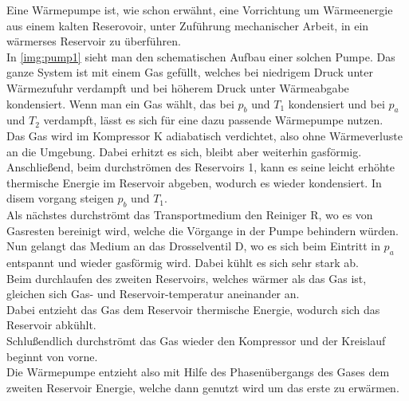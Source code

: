 Eine Wärmepumpe ist, wie schon erwähnt, eine Vorrichtung um Wärmeenergie aus einem kalten 
Reserovoir, unter Zuführung mechanischer Arbeit, in ein wärmerses Reservoir zu überführen.\\
In \ref{img:pump1} sieht man den schematischen Aufbau einer solchen Pumpe.
Das ganze System ist mit einem Gas gefüllt, welches bei niedrigem Druck unter Wärmezufuhr verdampft
und bei höherem Druck unter Wärmeabgabe kondensiert.
Wenn man ein Gas wählt, das bei $p_b$ und $T_1$ kondensiert und bei $p_a$ und $T_2$ verdampft,
lässt es sich für eine dazu passende Wärmepumpe nutzen.\\
Das Gas wird im Kompressor K adiabatisch verdichtet, also ohne Wärmeverluste an die Umgebung. 
Dabei erhitzt es sich, bleibt aber weiterhin gasförmig. 
Anschließend, beim durchströmen des Reservoirs 1, kann es seine leicht erhöhte thermische Energie
im Reservoir abgeben, wodurch es wieder kondensiert.
In disem vorgang steigen $p_b$ und $T_1$.\\
Als nächstes durchströmt das Transportmedium den Reiniger R, wo es von Gasresten bereinigt wird, 
welche die Vörgange in der Pumpe behindern würden.\\
Nun gelangt das Medium an das Drosselventil D, wo es sich beim Eintritt in $p_a$ entspannt und 
wieder gasförmig wird. Dabei kühlt es sich sehr stark ab.\\
Beim durchlaufen des zweiten Reservoirs, welches wärmer als das Gas ist, gleichen sich Gas- und Reservoir-temperatur aneinander an.\\
Dabei entzieht das Gas dem Reservoir thermische Energie, wodurch sich das Reservoir abkühlt.\\
Schlußendlich durchströmt das Gas wieder den Kompressor und der Kreislauf beginnt von vorne.\\
Die Wärmepumpe entzieht also mit Hilfe des Phasenübergangs des Gases dem zweiten Reservoir Energie, welche dann 
genutzt wird um das erste zu erwärmen.




